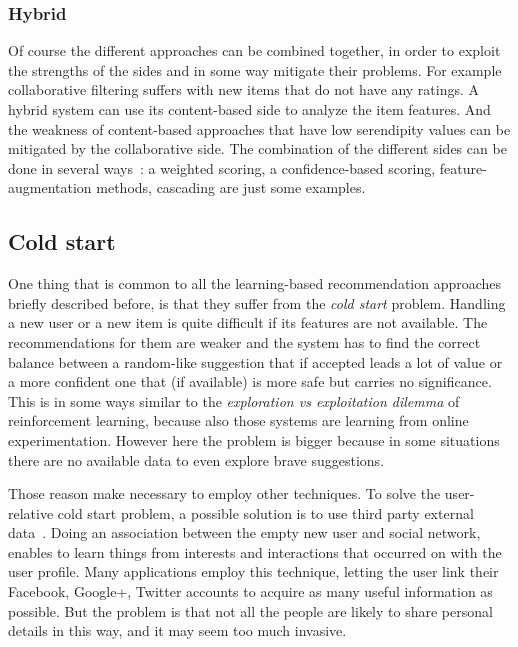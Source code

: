 \subsubsection{Hybrid}
Of course the different approaches can be combined together, in order to exploit the strengths of the sides and in some way mitigate their problems. For example collaborative filtering suffers with new items that do not have any ratings. A hybrid system can use its content-based side to analyze the item features. And the weakness of content-based approaches that have low serendipity values can be mitigated by the collaborative side. The combination of the different sides can be done in several ways~\cite{burke2007hybrid}: a weighted scoring, a confidence-based scoring, feature-augmentation methods, cascading are just some examples.

\subsection{Cold start}
\label{soaColdStart}

One thing that is common to all the learning-based recommendation approaches briefly described before, is that they suffer from the \textit{cold start} problem. Handling a new user or a new item is quite difficult if its features are not available. The recommendations for them are weaker and the system has to find the correct balance between a random-like suggestion that if accepted leads a lot of value or a more confident one that (if available) is more safe but carries no significance. This is in some ways similar to the \textit{exploration vs exploitation dilemma} of reinforcement learning, because also those systems are learning from online experimentation. However here the problem is bigger because in some situations there are no available data to even explore brave suggestions.

Those reason make necessary to employ other techniques. To solve the user-relative cold start problem, a possible solution is to use third party external data~\cite{son2016dealing}. Doing an association between the empty new user and social network, enables to learn things from interests and interactions that occurred on with the user profile. Many applications employ this technique, letting the user link their Facebook, Google+, Twitter accounts to acquire as many useful information as possible. But the problem is that not all the people are likely to share personal details in this way, and it may seem too much invasive.

